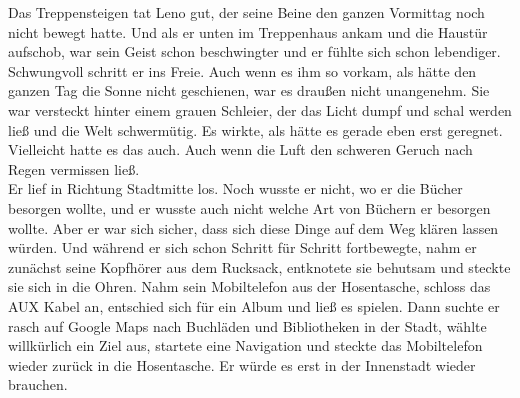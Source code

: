 \documentclass[ngerman,smalldemyvopaper,11pt,oneside,onecolumn,openright,extrafontsizes]{memoir}
\begin{document}
Das Treppensteigen tat Leno gut, der seine Beine den ganzen Vormittag noch nicht bewegt hatte. Und als er unten im Treppenhaus ankam und die Haustür aufschob, war sein Geist schon beschwingter und er fühlte sich schon lebendiger. Schwungvoll schritt er ins Freie. Auch wenn es ihm so vorkam, als hätte den ganzen Tag die Sonne nicht geschienen, war es draußen nicht unangenehm. Sie war versteckt hinter einem grauen Schleier, der das Licht dumpf und schal werden ließ und die Welt schwermütig. Es wirkte, als hätte es gerade eben erst geregnet. Vielleicht hatte es das auch. Auch wenn die Luft den schweren Geruch nach Regen vermissen ließ.\\
Er lief in Richtung Stadtmitte los. Noch wusste er nicht, wo er die Bücher besorgen wollte, und er wusste auch nicht welche Art von Büchern er besorgen wollte. Aber er war sich sicher, dass sich diese Dinge auf dem Weg klären lassen würden. Und während er sich schon Schritt für Schritt fortbewegte, nahm er zunächst seine Kopfhörer aus dem Rucksack, entknotete sie behutsam und steckte sie sich in die Ohren. Nahm sein Mobiltelefon aus der Hosentasche, schloss das AUX Kabel an, entschied sich für ein Album und ließ es spielen. Dann suchte er rasch auf Google Maps nach Buchläden und Bibliotheken in der Stadt, wählte willkürlich ein Ziel aus, startete eine Navigation und steckte das Mobiltelefon wieder zurück in die Hosentasche. Er würde es erst in der Innenstadt wieder brauchen.
\vspace{0.5em} \\
\end{document}
